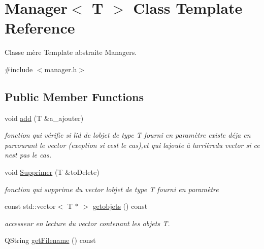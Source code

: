 \hypertarget{class_manager}{}\section{Manager$<$ T $>$ Class Template Reference}
\label{class_manager}


Classe mère Template abstraite Managers.  




{\ttfamily \#include $<$manager.\+h$>$}

\subsection*{Public Member Functions}
\begin{DoxyCompactItemize}
\item 
void \hyperlink{class_manager_a4eac07f3408be9a9c86273383e282b53}{add} (T \&a\+\_\+ajouter)
\begin{DoxyCompactList}\small\item\em fonction qui vérifie si l\textquotesingle{}id de l\textquotesingle{}objet de type T fourni en paramètre existe déja en parcourant le vector (exeption si c\textquotesingle{}est le cas),et qui l\textquotesingle{}ajoute à l\textquotesingle{}arrièredu vector si ce n\textquotesingle{}est pas le cas. \end{DoxyCompactList}\item 
void \hyperlink{class_manager_a5ad1071a0ca361daea98576c433774c8}{Supprimer} (T \&to\+Delete)
\begin{DoxyCompactList}\small\item\em fonction qui supprime du vector l\textquotesingle{}objet de type T fourni en paramètre \end{DoxyCompactList}\item 
\mbox{\label{class_manager_a53786650c42236c2c346cda79cb3cee3}} 
const std\+::vector$<$ T $\ast$ $>$ \hyperlink{class_manager_a53786650c42236c2c346cda79cb3cee3}{getobjets} () const
\begin{DoxyCompactList}\small\item\em accesseur en lecture du vector contenant les objets T. \end{DoxyCompactList}\item 
\mbox{\label{class_manager_a5f6a3a94521559731ef49005d7669464}} 
Q\+String \hyperlink{class_manager_a5f6a3a94521559731ef49005d7669464}{get\+Filename} () const

\end{DoxyCompactItemize}
